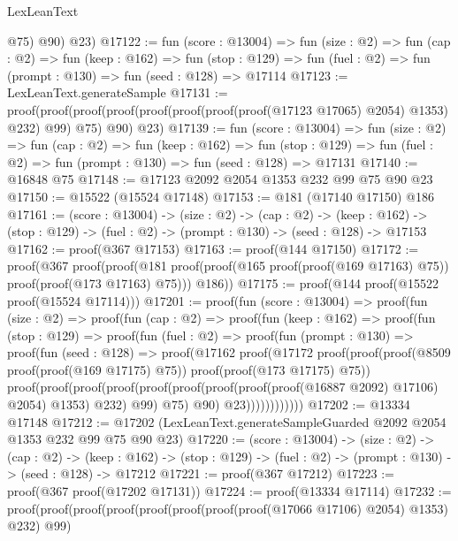 \begin{lexlean}{LexLeanText}
\begin{coremodule}
          @75)
        @90)
      @23)
@17122 := fun (score : @13004) =>
  fun (size : @2) =>
  fun (cap : @2) =>
  fun (keep : @162) =>
  fun (stop : @129) => fun (fuel : @2) => fun (prompt : @130) => fun (seed : @128) => @17114
@17123 := LexLeanText.generateSample
@17131 := proof(proof(proof(proof(proof(proof(proof(proof(@17123 @17065) @2054) @1353) @232) @99)
          @75)
        @90)
      @23)
@17139 := fun (score : @13004) =>
  fun (size : @2) =>
  fun (cap : @2) =>
  fun (keep : @162) =>
  fun (stop : @129) => fun (fuel : @2) => fun (prompt : @130) => fun (seed : @128) => @17131
@17140 := @16848 @75
@17148 := @17123 @2092 @2054 @1353 @232 @99 @75 @90 @23
@17150 := @15522 (@15524 @17148)
@17153 := @181 (@17140 @17150) @186
@17161 := (score : @13004) ->
  (size : @2) ->
  (cap : @2) ->
  (keep : @162) -> (stop : @129) -> (fuel : @2) -> (prompt : @130) -> (seed : @128) -> @17153
@17162 := proof(@367 @17153)
@17163 := proof(@144 @17150)
@17172 := proof(@367
      proof(proof(@181
            proof(proof(@165 proof(proof(@169 @17163) @75)) proof(proof(@173 @17163) @75)))
          @186))
@17175 := proof(@144 proof(@15522 proof(@15524 @17114)))
@17201 := proof(fun (score : @13004) =>
    proof(fun (size : @2) =>
      proof(fun (cap : @2) =>
        proof(fun (keep : @162) =>
          proof(fun (stop : @129) =>
            proof(fun (fuel : @2) =>
              proof(fun (prompt : @130) =>
                proof(fun (seed : @128) =>
                  proof(@17162
                      proof(@17172
                          proof(proof(proof(@8509 proof(proof(@169 @17175) @75))
                                proof(proof(@173 @17175) @75))
                              proof(proof(proof(proof(proof(proof(proof(proof(proof(@16887 @2092)
                                                @17106)
                                              @2054)
                                            @1353)
                                          @232)
                                        @99)
                                      @75)
                                    @90)
                                  @23))))))))))))
@17202 := @13334 @17148
@17212 := @17202 (LexLeanText.generateSampleGuarded @2092 @2054 @1353 @232 @99 @75 @90 @23)
@17220 := (score : @13004) ->
  (size : @2) ->
  (cap : @2) ->
  (keep : @162) -> (stop : @129) -> (fuel : @2) -> (prompt : @130) -> (seed : @128) -> @17212
@17221 := proof(@367 @17212)
@17223 := proof(@367 proof(@17202 @17131))
@17224 := proof(@13334 @17114)
@17232 := proof(proof(proof(proof(proof(proof(proof(proof(@17066 @17106) @2054) @1353) @232) @99)

\end{coremodule}
\end{lexlean}
